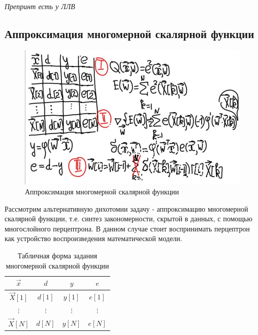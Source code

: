 \documentclass{article}
\numberwithin{equation}{subsection}
\begin{document}
\begin{myquote}
    \textit{Препринт есть у ЛЛВ}
\end{myquote}




\subsection{Аппроксимация многомерной скалярной функции}

\begin{figure}[htbp]
    \centering
    \includegraphics[height=7cm]{hyperflat_9_1.jpeg}
    \caption{Аппроксимация многомерной скалярной функции}
    \label{hyperflat_9_1}
\end{figure}

Рассмотрим альтернативную дихотомии задачу - аппроксимацию многомерной скалярной функции,  т.е.
синтез закономерности, скрытой в данных, с помощью многослойного перцептрона.
В данном случае стоит воспринимать перцептрон как устройство воспроизведения математической модели.

\begin{table}[H]
    \centering
    \begin{tabular}{| c | c | c | c |}
        \hline
        $\vec{x}$ & $d$ & $y$ & $e$ \\
        \hline
        $\vec{X}[1]$ & $d[1]$ & $y[1]$ & $e[1]$ \\
        \hline
        $\vdots$ & $\vdots$ & $\vdots$ & $\vdots$ \\
        \hline
        $\vec{X}[N]$ & $d[N]$ & $y[N]$ & $e[N]$ \\
        \hline
    \end{tabular}
    \label{table:scalar-func-table}
    \caption{Табличная форма задания многомерной скалярной функции}
\end{table}
\end{document}
